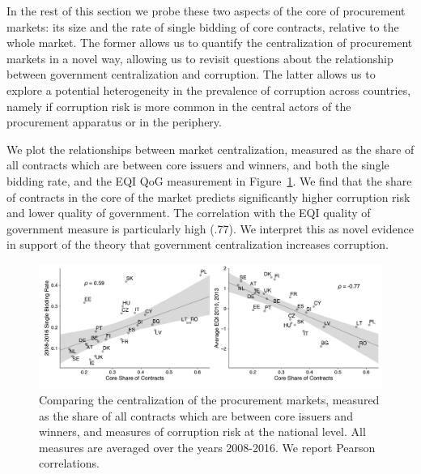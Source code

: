 In the rest of this section we probe these two aspects of the core of procurement markets: its size and the rate of single bidding of core contracts, relative to the whole market. The former allows us to quantify the centralization of procurement markets in a novel way, allowing us to revisit questions about the relationship between government centralization and corruption. The latter allows us to explore a potential heterogeneity in the prevalence of corruption across countries, namely if corruption risk is more common in the central actors of the procurement apparatus or in the periphery.

We plot the relationships between market centralization, measured as the share of all contracts which are between core issuers and winners, and both the single bidding rate, and the EQI QoG measurement in Figure~\ref{fig:centralization_vs_sb_eqi}. We find that the share of contracts in the core of the market predicts significantly higher corruption risk and lower quality of government. The correlation with the EQI quality of government measure is particularly high (.77). We interpret this as novel evidence in support of the theory that government centralization increases corruption. 

\begin{figure}
\centering
  \includegraphics[width=\textwidth]{images/ted_networks/core_vs_sb_eqi.pdf}
  \caption[Market Centralization and Corruption]{Comparing the centralization of the procurement markets, measured as the share of all contracts which are between core issuers and winners, and measures of corruption risk at the national level. All measures are averaged over the years 2008-2016. We report Pearson correlations.}
  \label{fig:centralization_vs_sb_eqi}
\end{figure}

